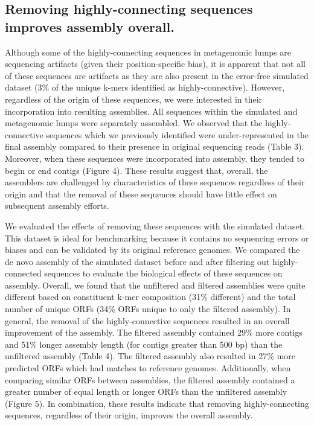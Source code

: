 \documentclass[11pt]{article} %
\begin{document}
\subsection{Removing highly-connecting sequences improves assembly overall.}
Although some of the highly-connecting sequences in metagenomic lumps are sequencing artifacts (given their position-specific bias), it is apparent that not all of these sequences are artifacts as they are also present in the error-free simulated dataset (3\% of the unique k-mers identified as highly-connective).  However, regardless of the origin of these sequences, we were interested in their incorporation into resulting assemblies.  All sequences within the simulated and metagenomic lumps were separately assembled.  We observed that the highly-connective sequences which we previously identified were under-represented in the final assembly compared to their presence in original sequencing reads (Table 3).  Moreover, when these sequences were incorporated into assembly, they tended to begin or end contigs (Figure 4).  These results suggest that, overall, the assemblers are challenged by characteristics of these sequences regardless of their origin and that the removal of these sequences should have little effect on subsequent assembly efforts. 

We evaluated the effects of removing these sequences with the simulated dataset.  This dataset is ideal for benchmarking because it contains no sequencing errors or biases and can be validated by its original reference genomes.  We compared the de novo assembly of the simulated dataset before and after filtering out highly-connected sequences to evaluate the biological effects of these sequences on assembly.  Overall, we found that the unfiltered and filtered assemblies were quite different based on constituent k-mer composition (31\% different) and the total number of unique ORFs (34\% ORFs unique to only the filtered assembly).  In general, the removal of the highly-connective sequences resulted in an overall improvement of the assembly.  The filtered assembly contained 29\% more contigs and 51\% longer assembly length (for contigs greater than 500 bp) than the unfiltered assembly (Table 4).  The filtered assembly also resulted in 27\% more predicted ORFs which had matches to reference genomes.  Additionally, when comparing similar ORFs between assemblies, the filtered assembly contained a greater number of equal length or longer ORFs than the unfiltered assembly (Figure 5).  In combination, these results indicate that removing highly-connecting sequences, regardless of their origin, improves the overall assembly.  
\end{document}
